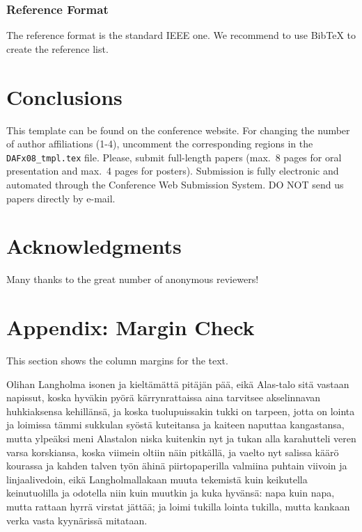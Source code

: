 \documentclass[twoside,a4paper]{article}
\begin{document}
\subsubsection{Reference Format}
The reference format is the standard IEEE one. We recommend to use BibTeX to create the reference list.

\section{Conclusions}
This template can be found on the conference website.
For changing the number of author affiliations (1-4), uncomment the corresponding regions in the \texttt{DAFx08\_tmpl.tex} file.
Please, submit full-length papers (max.~8 pages for oral presentation and max.~4 pages for posters).
Submission is fully electronic and automated through the Conference Web Submission System.
DO NOT send us papers directly by e-mail.

\section{Acknowledgments}
Many thanks to the great number of anonymous reviewers!

\nocite{*}


\section{Appendix: Margin Check}
This section shows the column margins for the text. \bigskip\newline

Olihan Langholma isonen ja kielt\"{a}m\"{a}tt\"{a} pit\"{a}j\"{a}n p\"{a}\"{a}, eik\"{a} Alas-talo sit\"{a}
vastaan napissut, koska hyv\"{a}kin py\"{o}r\"{a} k\"{a}rrynrattaissa aina tarvitsee
akselinnavan huhkiaksensa kehill\"{a}ns\"{a}, ja koska tuolupuissakin tukki on
tarpeen, jotta on lointa ja loimissa t\"{a}mmi sukkulan sy\"{o}st\"{a} kuteitansa
ja kaiteen naputtaa kangastansa, mutta ylpe\"{a}ksi meni Alastalon niska
kuitenkin nyt ja tukan alla karahutteli veren varsa korskiansa, koska
viimein oltiin n\"{a}in pitk\"{a}ll\"{a}, ja vaelto nyt salissa k\"{a}\"{a}r\"{o} kourassa ja
kahden talven ty\"{o}n \"{a}hin\"{a} piirtopaperilla valmiina puhtain viivoin ja
linjaalivedoin, eik\"{a} Langholmallakaan muuta tekemist\"{a} kuin keikutella
keinutuolilla ja odotella niin kuin muutkin ja kuka hyv\"{a}ns\"{a}: napa kuin
napa, mutta rattaan hyrr\"{a} virstat j\"{a}tt\"{a}\"{a}; ja loimi tukilla lointa
tukilla, mutta kankaan verka vasta kyyn\"{a}riss\"{a} mitataan.
\end{document}
